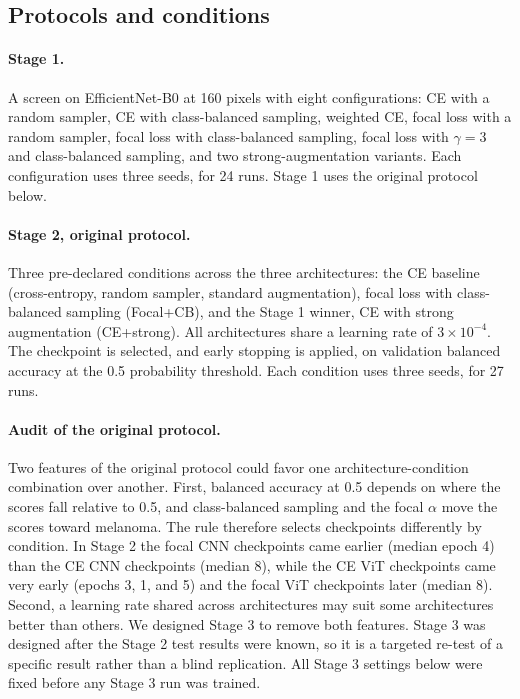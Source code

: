 \documentclass[11pt]{article}
\begin{document}
\subsection{Protocols and conditions}
\label{sec:protocols}

\paragraph{Stage 1.} A screen on EfficientNet-B0 at 160 pixels with eight configurations: CE with a random sampler, CE with class-balanced sampling, weighted CE, focal loss with a random sampler, focal loss with class-balanced sampling, focal loss with $\gamma=3$ and class-balanced sampling, and two strong-augmentation variants. Each configuration uses three seeds, for 24 runs. Stage 1 uses the original protocol below.

\paragraph{Stage 2, original protocol.} Three pre-declared conditions across the three architectures: the CE baseline (cross-entropy, random sampler, standard augmentation), focal loss with class-balanced sampling (Focal+CB), and the Stage 1 winner, CE with strong augmentation (CE+strong). All architectures share a learning rate of $3\times10^{-4}$. The checkpoint is selected, and early stopping is applied, on validation balanced accuracy at the 0.5 probability threshold. Each condition uses three seeds, for 27 runs.

\paragraph{Audit of the original protocol.} Two features of the original protocol could favor one architecture-condition combination over another. First, balanced accuracy at 0.5 depends on where the scores fall relative to 0.5, and class-balanced sampling and the focal $\alpha$ move the scores toward melanoma. The rule therefore selects checkpoints differently by condition. In Stage 2 the focal CNN checkpoints came earlier (median epoch 4) than the CE CNN checkpoints (median 8), while the CE ViT checkpoints came very early (epochs 3, 1, and 5) and the focal ViT checkpoints later (median 8). Second, a learning rate shared across architectures may suit some architectures better than others. We designed Stage 3 to remove both features. Stage 3 was designed after the Stage 2 test results were known, so it is a targeted re-test of a specific result rather than a blind replication. All Stage 3 settings below were fixed before any Stage 3 run was trained.
\end{document}
